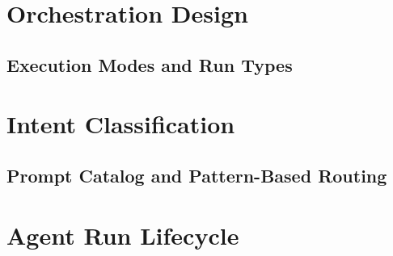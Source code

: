 \documentclass[a4paper,twoside]{sapthesis}
\begin{document}

\section{Orchestration Design}
\label{sec:orchestration-design}

\subsection{Execution Modes and Run Types}

\section{Intent Classification}
\label{sec:intent-classification}

\subsection{Prompt Catalog and Pattern-Based Routing}

\section{Agent Run Lifecycle}
\label{sec:agent-run-lifecycle}
\end{document}
